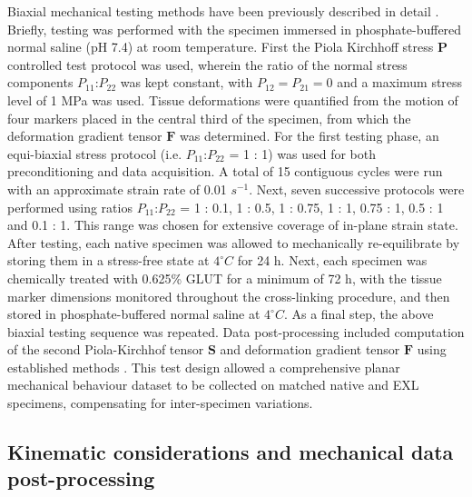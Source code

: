     Biaxial mechanical testing methods have been previously described in detail \cite{sacks_orthotropic_1998,sacks_method_1999}. Briefly, testing was performed with the specimen immersed in phosphate-buffered normal saline (pH 7.4) at room temperature. First the Piola Kirchhoff stress $\mathbf{P}$ controlled test protocol was used, wherein the ratio of the normal stress components $P_{11}$:$P_{22}$ was kept constant, with $P_{12} = P_{21} = 0$ and a maximum stress level of 1 MPa was used. Tissue deformations were quantified from the motion of four markers placed in the central third of the specimen, from which the deformation gradient tensor $\mathbf{F}$ was determined. For the first testing phase, an equi-biaxial stress protocol (i.e. $P_{11}$:$P_{22}$ = 1 : 1) was used for both preconditioning and data acquisition. A total of 15 contiguous cycles were run with an approximate strain rate of 0.01 $s^{-1}$. Next, seven successive protocols were performed using ratios $P_{11}$:$P_{22}$ = 1 : 0.1, 1 : 0.5, 1 : 0.75, 1 : 1, 0.75 : 1, 0.5 : 1 and 0.1 : 1. This range was chosen for extensive coverage of in-plane strain state. After testing, each native specimen was allowed to mechanically re-equilibrate by storing them in a stress-free state at $4^\circ C$ for 24 h. Next, each specimen was chemically treated with 0.625\% GLUT for a minimum of 72 h, with the tissue marker dimensions monitored throughout the cross-linking procedure, and then stored in phosphate-buffered normal saline at $4^\circ C$. As a final step, the above biaxial testing sequence was repeated. Data post-processing included computation of the second Piola-Kirchhof tensor $\mathbf{S}$ and deformation gradient tensor $\mathbf{F}$ using established methods \cite{zhang_generalized_2015}. This test design allowed a comprehensive planar mechanical behaviour dataset to be collected on matched native and EXL specimens, compensating for inter-specimen variations.
    
    
    
    
\subsection{Kinematic considerations and mechanical data post-processing}

